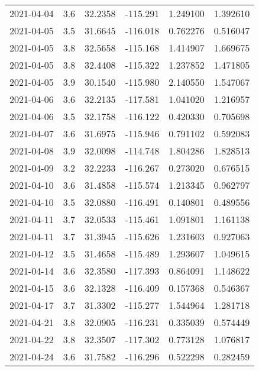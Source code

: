 \begin{tabular}{lrrrrr}
2021-04-04 &       3.6 &  32.2358 &  -115.291 &         1.249100 &         1.392610 \\
2021-04-05 &       3.5 &  31.6645 &  -116.018 &         0.762276 &         0.516047 \\
2021-04-05 &       3.8 &  32.5658 &  -115.168 &         1.414907 &         1.669675 \\
2021-04-05 &       3.8 &  32.4408 &  -115.322 &         1.237852 &         1.471805 \\
2021-04-05 &       3.9 &  30.1540 &  -115.980 &         2.140550 &         1.547067 \\
2021-04-06 &       3.6 &  32.2135 &  -117.581 &         1.041020 &         1.216957 \\
2021-04-06 &       3.5 &  32.1758 &  -116.122 &         0.420330 &         0.705698 \\
2021-04-07 &       3.6 &  31.6975 &  -115.946 &         0.791102 &         0.592083 \\
2021-04-08 &       3.9 &  32.0098 &  -114.748 &         1.804286 &         1.828513 \\
2021-04-09 &       3.2 &  32.2233 &  -116.267 &         0.273020 &         0.676515 \\
2021-04-10 &       3.6 &  31.4858 &  -115.574 &         1.213345 &         0.962797 \\
2021-04-10 &       3.5 &  32.0880 &  -116.491 &         0.140801 &         0.489556 \\
2021-04-11 &       3.7 &  32.0533 &  -115.461 &         1.091801 &         1.161138 \\
2021-04-11 &       3.7 &  31.3945 &  -115.626 &         1.231603 &         0.927063 \\
2021-04-12 &       3.5 &  31.4658 &  -115.489 &         1.293607 &         1.049615 \\
2021-04-14 &       3.6 &  32.3580 &  -117.393 &         0.864091 &         1.148622 \\
2021-04-15 &       3.6 &  32.1328 &  -116.409 &         0.157368 &         0.546367 \\
2021-04-17 &       3.7 &  31.3302 &  -115.277 &         1.544964 &         1.281718 \\
2021-04-21 &       3.8 &  32.0905 &  -116.231 &         0.335039 &         0.574449 \\
2021-04-22 &       3.8 &  32.3507 &  -117.302 &         0.773128 &         1.076817 \\
2021-04-24 &       3.6 &  31.7582 &  -116.296 &         0.522298 &         0.282459 \\

\end{tabular}
